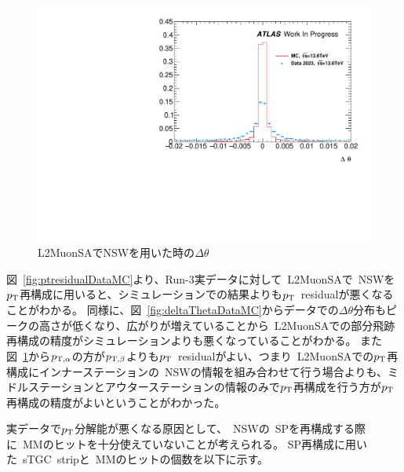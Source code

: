 \begin{figure}[H]
    \centering
    \includegraphics[clip, width=12cm]{fig/5/deltaTheta_NSW.pdf}
    \caption{L2MuonSAでNSWを用いた時の$\Delta \theta$}
    \label{fig:ptresidualAlphaBeta}
\end{figure}


図~\ref{fig:ptresidualDataMC}より、Run-3実データに対して~L2MuonSAで~NSWを$p_\mathrm{T}$再構成に用いると、シミュレーションでの結果よりも$p_\mathrm{T}$~residualが悪くなることがわかる。
同様に、図~\ref{fig:deltaThetaDataMC}からデータでの$\Delta \theta$分布もピークの高さが低くなり、広がりが増えていることから~L2MuonSAでの部分飛跡再構成の精度がシミュレーションよりも悪くなっていることがわかる。
また図~\ref{fig:ptresidualAlphaBeta}から$p_{\rm{T, \alpha}}$の方が$p_{\rm{T, \beta}}$よりも$p_\mathrm{T}$~residualがよい、つまり~L2MuonSAでの$p_\mathrm{T}$再構成にインナーステーションの~NSWの情報を組み合わせて行う場合よりも、ミドルステーションとアウターステーションの情報のみで$p_\mathrm{T}$再構成を行う方が$p_\mathrm{T}$再構成の精度がよいということがわかった。

実データで$p_\mathrm{T}$分解能が悪くなる原因として、~NSWの~SPを再構成する際に~MMのヒットを十分使えていないことが考えられる。
SP再構成に用いた~sTGC~stripと~MMのヒットの個数を以下に示す。

